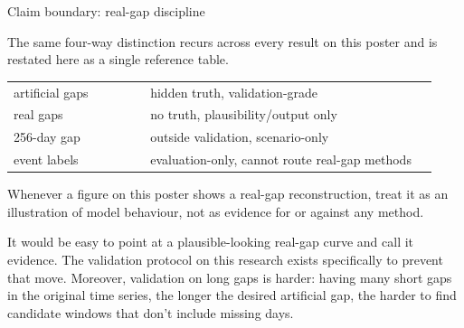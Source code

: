 \documentclass[10pt]{article}
\renewcommand{\arraystretch}{1.05}
\newlength{\gapw}
\newlength{\colw}
\newcommand{\smallbody}[1]{{\RaggedRight\fontsize{16.3}{18.3}\selectfont\color{dark}#1\par}}
\begin{document}
\begin{minipage}[t]{\colw}
\begin{panel}[height=10cm]{Claim boundary: real-gap discipline}
\smallbody{The same four-way distinction recurs across every result on this poster and is restated here as a single reference table.}
\vspace{0.5cm}
{\fontsize{13.2}{14.8}\selectfont
\renewcommand{\arraystretch}{1.34}
\begin{tabular}{@{}p{0.30\linewidth}p{0.63\linewidth}@{}}
\rowcolor{softgreen}artificial gaps & hidden truth, validation-grade\\
\rowcolor{softsand}real gaps & no truth, plausibility/output only\\
\rowcolor{softred}256-day gap & outside validation, scenario-only\\
\rowcolor{softgray}event labels & evaluation-only, cannot route real-gap methods\\
\end{tabular}}
\vspace{0.14cm}
\smallbody{Whenever a figure on this poster shows a real-gap reconstruction, treat it as an illustration of model behaviour, not as evidence for or against any method.}
\vspace{0.34cm}
\smallbody{It would be easy to point at a plausible-looking real-gap curve and call it evidence. The validation protocol on this research exists specifically to prevent that move. Moreover, validation on long gaps is harder: having many short gaps in the original time series, the longer the desired artificial gap, the harder to find candidate windows that don't include missing days.}
\end{panel}

\end{minipage}\hspace{\gapw}%
\end{document}
